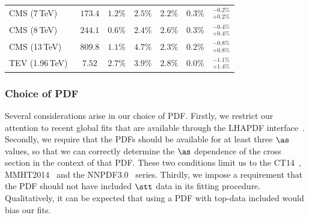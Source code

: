 \begin{table}[ht]
\begin{tabular}{l c c c c c c }
    CMS   (7\,TeV)~\cite{Khachatryan:2016mqs}             & $173.4  $ & $1.2 \%$  & $2.5 \%$  & $2.2 \%$  & $0.3 \%$  & ${}^{-0.2\%}_{+0.2\%}$         \\
    CMS   (8\,TeV)~\cite{Khachatryan:2016mqs}             & $244.1  $ & $0.6 \%$  & $2.4 \%$  & $2.6 \%$  & $0.3 \%$  & ${}^{-0.4\%}_{+0.4\%}$         \\
    CMS   (13\,TeV)~\cite{Khachatryan:2015uqb}            & $809.8  $ & $1.1 \%$  & $4.7 \%$  & $2.3 \%$  & $0.2 \%$  & ${}^{-0.8\%}_{+0.8\%}$         \\
    TEV   (1.96\,TeV)~\cite{Aaltonen:2013wca}  & $7.52   $ & $2.7 \%$  & $3.9 \%$  & $2.8 \%$  & $0.0 \%$  & ${}^{-1.1\%}_{+1.4\%}$         \\
    \end{tabular}
\end{table}


\subsubsection{Choice of PDF}
\label{sec:pdf-choice}

Several considerations arise in our choice of PDF. 
%
Firstly, we restrict our attention to recent global fits that are
available through the LHAPDF interface~\cite{Buckley:2014ana}.
%
Secondly, we require that the PDFs should be available for at least
three $\as$ values, so that we can correctly determine the $\as$
dependence of the cross section in the context of that PDF.
%
These two conditions limit us to the CT14~\cite{Dulat:2015mca},
MMHT2014~\cite{Harland-Lang:2014zoa} and the NNPDF3.0~\cite{Ball:2014uwa} series.
%
Thirdly, we impose a requirement that the PDF should not have included
$\stt$ data in its fitting procedure.
%
% 
Qualitatively, it can be expected that using a PDF with top-data included would bias our fits.


